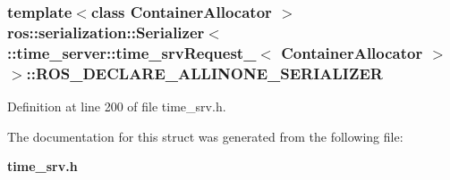 \subsubsection[{\-R\-O\-S\-\_\-\-D\-E\-C\-L\-A\-R\-E\-\_\-\-A\-L\-L\-I\-N\-O\-N\-E\-\_\-\-S\-E\-R\-I\-A\-L\-I\-Z\-E\-R}]{\setlength{\rightskip}{0pt plus 5cm}template$<$class Container\-Allocator $>$ ros\-::serialization\-::\-Serializer$<$ \-::{\bf time\-\_\-server\-::time\-\_\-srv\-Request\-\_\-}$<$ \-Container\-Allocator $>$ $>$\-::{\bf \-R\-O\-S\-\_\-\-D\-E\-C\-L\-A\-R\-E\-\_\-\-A\-L\-L\-I\-N\-O\-N\-E\-\_\-\-S\-E\-R\-I\-A\-L\-I\-Z\-E\-R}}\label{structros_1_1serialization_1_1Serializer_3_01_1_1time__server_1_1time__srvRequest___3_01ContainerAllocator_01_4_01_4_ae5af1fd12548404967ae2f67187cdcb0}


\-Definition at line 200 of file time\-\_\-srv.\-h.



\-The documentation for this struct was generated from the following file\-:\begin{DoxyCompactItemize}
\item 
{\bf time\-\_\-srv.\-h}\end{DoxyCompactItemize}

